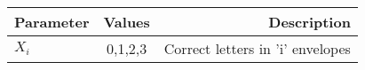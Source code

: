 \begin{tabular}{|l|c|r|}
    \hline
    Parameter & Values & Description\\
    \hline
    $X_i$ & 0,1,2,3 & Correct letters in 'i' envelopes\\
    \hline
\end{tabular}
